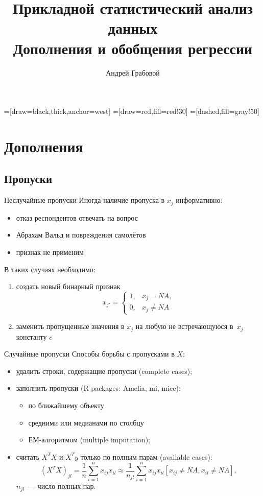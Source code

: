 \documentclass[9pt,pdf,utf8,hyperref={unicode},aspectratio=169]{beamer}
\title[Дополнения и обобщения регрессии]{Прикладной статистический анализ данных\\ Дополнения и обобщения регрессии}
\author{Андрей Грабовой}
\date{}
\begin{document}
=[draw=black,thick,anchor=west]
=[draw=red,fill=red!30]
=[dashed,fill=gray!50]

\begin{frame}
    \titlepage
\end{frame}

\section{Дополнения}
\subsection{Пропуски}
\begin{frame}{Неслучайные пропуски}
	Иногда наличие пропуска в $x_j$ информативно:
	
	\begin{itemize}
	\item отказ респондентов отвечать на вопрос
	\item Абрахам Вальд и повреждения самолётов
	\item признак не применим
	\end{itemize}	

	\bigskip

	В таких случаях необходимо:
	\begin{enumerate}
	\item создать новый бинарный признак $$x_{j'}=\begin{cases}1, & x_j=NA, \\ 0, & x_j\neq NA\end{cases}$$
	\item заменить пропущенные значения в $x_j$ на любую не встречающуюся в~$x_j$ константу $c$
	\end{enumerate}
\end{frame}

\begin{frame}{Случайные пропуски}
	Способы борьбы с пропусками в $X$:
	\begin{itemize}
		\item удалить строки, содержащие пропуски (complete cases);
		\item заполнить пропуски (R packages: Amelia, mi, mice):
			\begin{itemize}
			\item по ближайшему объекту
			\item средними или медианами по столбцу
			\item ЕМ-алгоритмом (multiple imputation);
			\end{itemize} 
		\item считать $X^TX$ и $X^Ty$ только по полным парам (available cases):
		$$\left(X^TX\right)_{jl} = \frac1{n}\sum_{i=1}^n x_{ij} x_{il} \approx \frac1{n_{jl}}\sum_{i=1}^n x_{ij} x_{il} \left[x_{ij}\neq NA,  x_{il}\neq NA\right] ,$$
		$n_{jl}$~--- число полных пар.
	\end{itemize}
	
	\bigskip

\end{frame}
\end{document}
